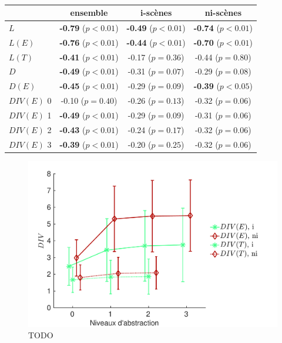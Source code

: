 \begin{table}[t]
\centering
\begin{tabular}{l c c c} 
               & ensemble                     & i-scènes                   & ni-scènes    \\
\hline
$L$            & \textbf{-0.79} ($p<0.01$)    & \textbf{-0.49} ($p<0.01$)  & \textbf{-0.74} ($p<0.01$)\\
$L(E)$         & \textbf{-0.76} ($p<0.01$)    & \textbf{-0.44} ($p<0.01$)  & \textbf{-0.70} ($p<0.01$)\\
$L(T)$         & \textbf{-0.41} ($p<0.01$)    & -0.17 ($p=0.36$)           & -0.44 ($p=0.80$) \\
$D$            & \textbf{-0.49} ($p<0.01$)    & -0.31 ($p=0.07$)           & -0.29 ($p=0.08$)\\
$D(E)$         & \textbf{-0.45} ($p<0.01$)    & -0.29 ($p=0.09$)           & \textbf{-0.39} ($p<0.05$)\\
$DIV(E)$ 0     &         -0.10  ($p=0.40$)    & -0.26 ($p=0.13$)           & -0.32 ($p=0.06$)\\
$DIV(E)$ 1     & \textbf{-0.49} ($p<0.01$)    & -0.29 ($p=0.09$)           & -0.31 ($p=0.06$)\\
$DIV(E)$ 2     & \textbf{-0.43} ($p<0.01$)    & -0.24 ($p=0.17$)           & -0.32 ($p=0.06$)\\
$DIV(E)$ 3     & \textbf{-0.39} ($p<0.01$)    & -0.20 ($p=0.25$)           & -0.32 ($p=0.06$)\\
\hline
\end{tabular}
\vspace{0.5mm}
\caption{}
\label{tab:corrSmXP4}
\end{table}

\begin{figure}[t]
        \myfloatalign
        \includegraphics[width=.8\linewidth]{gfx/ch_5/xp4_div_1}
        \caption[TODO]{TODO}\label{fig:diversitySansMarker}
\end{figure}

